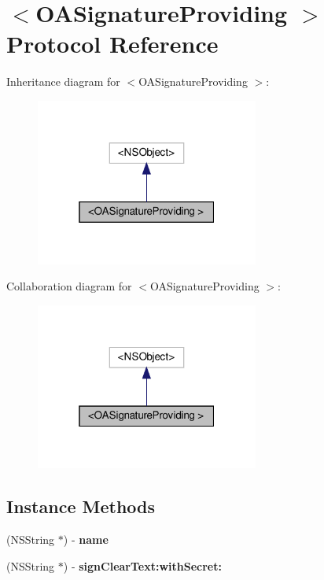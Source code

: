 \hypertarget{protocolOASignatureProviding_01-p}{}\section{$<$O\+A\+Signature\+Providing $>$ Protocol Reference}
\label{protocolOASignatureProviding_01-p}


Inheritance diagram for $<$O\+A\+Signature\+Providing $>$\+:
\nopagebreak
\begin{figure}[H]
\begin{center}
\leavevmode
\includegraphics[width=208pt]{protocolOASignatureProviding_01-p__inherit__graph}
\end{center}
\end{figure}


Collaboration diagram for $<$O\+A\+Signature\+Providing $>$\+:
\nopagebreak
\begin{figure}[H]
\begin{center}
\leavevmode
\includegraphics[width=208pt]{protocolOASignatureProviding_01-p__coll__graph}
\end{center}
\end{figure}
\subsection*{Instance Methods}
\begin{DoxyCompactItemize}
\item 
\mbox{\label{protocolOASignatureProviding_01-p_a3c80359d4b4a4d63fac28a4f9bb63f06}} 
(N\+S\+String $\ast$) -\/ {\bfseries name}
\item 
\mbox{\label{protocolOASignatureProviding_01-p_a931a037bba0e6ef8e77a471119d49d68}} 
(N\+S\+String $\ast$) -\/ {\bfseries sign\+Clear\+Text\+:with\+Secret\+:}
\end{DoxyCompactItemize}


